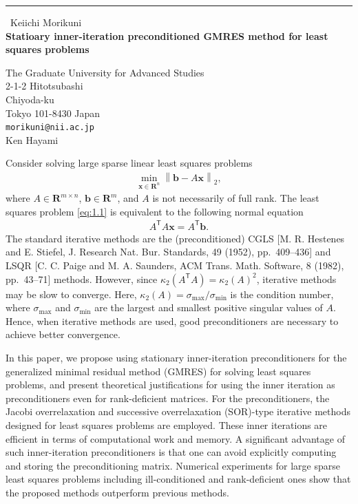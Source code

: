 \documentclass{report}
\begin{document}
\begin{center}
\rule{6in}{1pt} \
{\large Keiichi Morikuni \\
{\bf Statioary inner-iteration preconditioned GMRES method for least squares problems}}

The Graduate University for Advanced Studies \\ 2-1-2 Hitotsubashi \\ Chiyoda-ku \\ Tokyo 101-8430 Japan
\\
{\tt morikuni@nii.ac.jp}\\
Ken Hayami\end{center}

\newtheorem{theorem}{Theorem}
\newtheorem{definition}{Definition}

Consider solving large sparse linear least squares problems
\begin{align}
\min_{\boldsymbol{x} \in \mathbf{R}^n}{\left\| \boldsymbol{b} - A
\boldsymbol{x} \right\|_2},
\label{eq:1.1}
\end{align}
where $A \in \mathbf{R}^{m \times n}$, $\boldsymbol{b} \in \mathbf{R}^m$,
and $A$ is not necessarily of full rank.
The least squares problem \eqref{eq:1.1} is equivalent to the following normal equation
\begin{align}
A^\mathsf{T} A \boldsymbol{x} = A^\mathsf{T} \boldsymbol{b}.
\label{eq:1.2}
\end{align}
The standard iterative methods are the (preconditioned) CGLS [M. R.
\break Hestenes and E. Stiefel, J. Research Nat. Bur. Standards, 49
(1952), pp.~409--436] and LSQR [C. C. Paige and M. A. Saunders, ACM
Trans. Math. Software, 8 (1982), pp.~43--71] methods.
However, since $\kappa_2 (A^\mathsf{T}A) = {\kappa_2 (A)}^2$, iterative
methods may be slow to converge.
Here, $\kappa_2 (A) = \sigma_\mathrm{max} / \sigma_\mathrm{min}$ is the condition number,
where $\sigma_\mathrm{max}$ and $\sigma_\mathrm{min}$ are the largest and
smallest positive singular values of $A$.
Hence, when iterative methods are used, good preconditioners are
necessary to achieve better convergence.

In this paper, we propose using stationary inner-iteration
preconditioners for the generalized minimal residual method (GMRES) for
solving least squares problems, and present theoretical justifications
for using the inner iteration as preconditioners even for rank-deficient
matrices.
For the preconditioners, the Jacobi overrelaxation and successive
overrelaxation (SOR)-type iterative methods designed for least squares
problems are employed.
These inner iterations are efficient in terms of computational work and memory.
A significant advantage of such inner-iteration preconditioners is that
one can avoid explicitly computing and storing the preconditioning
matrix.
Numerical experiments for large sparse least squares problems including
ill-conditioned and rank-deficient ones show that the proposed methods
outperform previous methods.
\end{document}
